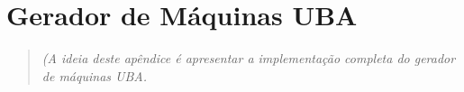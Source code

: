 
\chapter{Gerador de Máquinas UBA}
\label{cap:isv:semantica} %

\begin{quote}
\textit{(A ideia deste apêndice é apresentar a implementação completa do gerador de máquinas UBA.}
\end{quote}
